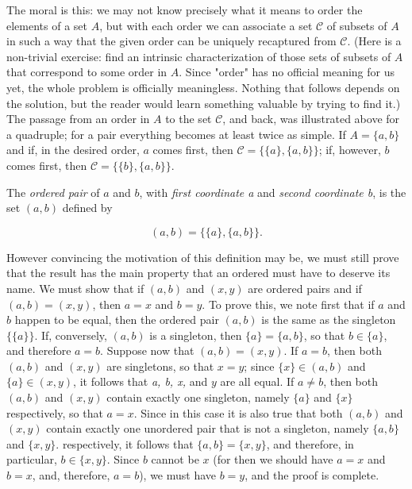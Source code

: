 The moral is this: we may not know precisely what it means to order the elements of a set $A$, but with each order we can associate a set $ \mathcal{C} $ of subsets of $A$ in such a way that the given order can be uniquely recaptured from $ \mathcal{C} $. (Here is a non-trivial exercise: find an intrinsic characterization of those sets of subsets of $A$ that correspond to some order in $A$. Since "order" has no official meaning for us yet, the whole problem is officially meaningless. Nothing that follows depends on the solution, but the reader would learn something valuable by trying to find it.) The passage from an order in $A$ to the set $ \mathcal{C} $, and back, was illustrated above for a quadruple; for a pair everything becomes at least twice as simple. If $ A = \{ a,b \}$ and if, in the desired order, $a$ comes first, then $ \mathcal{C} = \{ \{ a \} , \{ a,b \} \}$; if, however, $b$ comes first, then $ \mathcal{C} = \{ \{ b \}, \{a, b \}\}$. 

The \textit{ordered pair} of $a$ and $b$, with \textit{first coordinate a} and \textit{second coordinate b}, is the set $(a, b)$ defined by 

\begin{equation*}
(a, b) = \{ \{a \} , \{ a, b \} \}.
\end{equation*}

However convincing the motivation of this definition may be, we must still prove that the result has the main property that an ordered must have to deserve its name. We must show that if $(a,b)$ and $(x, y)$ are ordered pairs and if $(a,b) = (x,y)$, then $ a = x $ and $b = y$. To prove this, we note first that if $a$ and $b$ happen to be equal, then the ordered pair $(a,b)$ is the same as the singleton $ \{ \{ a \} \} $. If, conversely, $(a,b)$ is a singleton, then $ \{ a \} =  \{ a , b \}$, so that $ b \in \{ a \} $, and therefore $a = b$. Suppose now that $ (a, b) = (x, y)$. If $ a = b $, then both $(a, b)$ and $(x,y)$ are singletons, so that $ x = y $; since $ \{ x \} \in (a,b)$ and $ \{ a \} \in (x,y)$, it follows that \textit{a, b, x,} and $y$ are all equal. If $a \neq b$, then both $(a, b)$ and $(x, y)$ contain exactly one singleton, namely $ \{a \}$ and $ \{ x \} $ respectively, so that $a = x$. Since in this case it is also true that both $(a,b)$ and $(x, y)$ contain exactly one unordered pair that is not a singleton, namely $ \{a, b \}$ and $ \{ x, y \}$. respectively, it follows that $ \{ a, b \} = \{ x,y \} $, and therefore, in particular, $b \in \{ x,y \} $. Since $b$ cannot be $x$ (for then we should have $ a = x $ and $ b = x $, and, therefore, $ a = b $), we must have $b = y $, and the proof is complete. 

